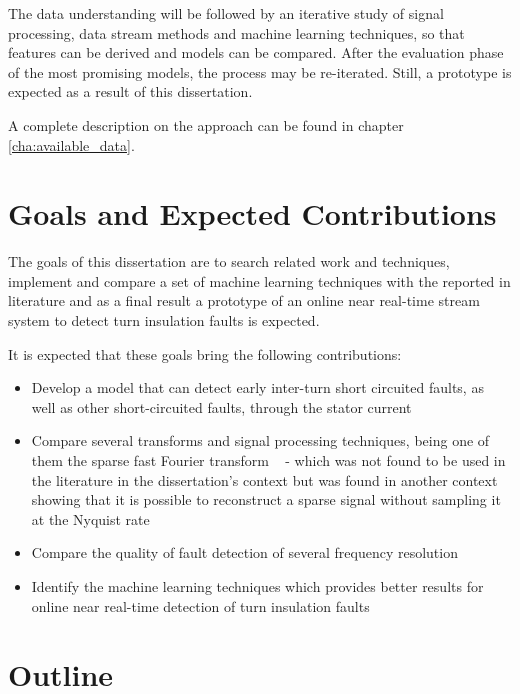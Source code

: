 The data understanding will be followed by an iterative study of signal processing, data stream methods and machine learning techniques, so that features can be derived and models can be compared.
After the evaluation phase of the most promising models, the process may be re-iterated. Still, a prototype is expected as a result of this dissertation.

A complete description on the approach can be found in chapter \ref{cha:available_data}.






\section{Goals and Expected Contributions} %
\label{sec:contributions}

The goals of this dissertation are to search related work and techniques, implement and compare a set of machine learning techniques with the reported in literature and as a final result a prototype of an online  near real-time stream system to detect turn insulation faults is expected.

It is expected that these goals bring the following contributions:


\begin{itemize}
  \item 
  Develop a model that can detect early inter-turn short circuited faults, as well as other short-circuited faults, through the stator current
  \item 
  Compare several transforms and signal processing techniques, being one of them the sparse fast Fourier transform  ~\cite{Indyk2014} - which was not found to be used in the literature in the dissertation's context but was found in another context showing that it is possible to reconstruct a sparse signal without sampling it at the Nyquist rate ~\cite{Hassanieh2014}
  \item 
  Compare the quality of fault detection of several frequency resolution
  \item 
  Identify the machine learning techniques which provides better results for online near real-time detection of turn insulation faults
\end{itemize}


\section{Outline} %
\label{sec:outline}

